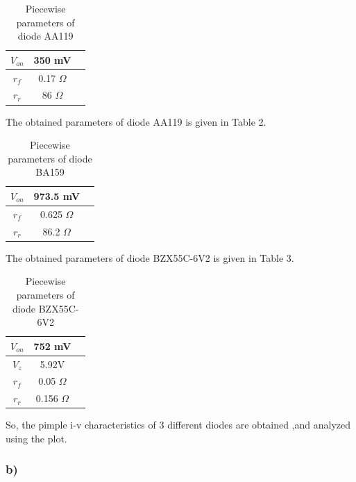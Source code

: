 \documentclass[letterpaper,12pt]{article}
\begin{document}
\begin{table}[H]
    \begin{center}
    \caption{Piecewise parameters of diode AA119}
    \vspace{2mm}
    \begin{tabular}{|| c | c | c ||}
    \hline
    \(V_{on}\) & 350 mV \\
    \hline 
    \(r_f\) & 0.17 \(\Omega\) \\
    \hline
    \(r_r\) & 86 \(\Omega\)\\
    \hline
    \end{tabular}
\end{center}
\end{table}
The obtained parameters of diode AA119 is given in Table 2.
\begin{table}[H]
    \centering
    \caption{Piecewise parameters of diode BA159}
    \vspace{2mm}
    \begin{tabular}{||c | c | c||}
    \hline
    \(V_{on}\) & 973.5 mV \\
    \hline
    \(r_f\) & 0.625 \(\Omega\) \\
    \hline
    \(r_r\) & 86.2 \(\Omega\)\\
    \hline
    \end{tabular}
\end{table}
The obtained parameters of diode BZX55C-6V2 is given in Table 3.
\begin{table}[H]
    \centering
    \caption{Piecewise parameters of diode BZX55C-6V2}
    \begin{tabular}{||c | c | c||}
        \hline
    \(V_{on}\) & 752 mV \\
    \hline
    \(V_{z}\) & 5.92V \\
    \hline
    \(r_f\) & 0.05 \(\Omega\) \\
    \hline
    \(r_r\) & 0.156 \(\Omega\) \\
    \hline
    \end{tabular}
\end{table}
So, the pimple i-v characteristics of 3 different diodes are obtained ,and analyzed using the plot.

\subsubsection{b)}
\end{document}
